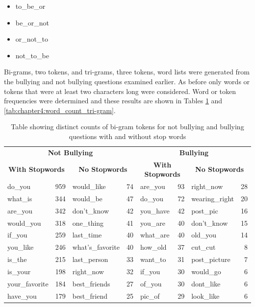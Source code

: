 \begin{itemize}

	\item to\_be\_or
	\item be\_or\_not
	\item or\_not\_to
	\item not\_to\_be
	
\end{itemize}

Bi-grams, two tokens, and tri-grams, three tokens, word lists were generated from the bullying and not bullying questions examined earlier. As before only words or tokens that were at least two characters long were considered. Word or token frequencies were determined and these results are shown in Tables \ref{tab:chapter4:word_count_bi-gram} and \ref{tab:chapter4:word_count_tri-gram}.

\begin{table}[h]
\centering
\caption[Distinct bi-gram word counts]{Table showing distinct counts of bi-gram tokens for not bullying and bullying questions with and without stop words}
\label{tab:chapter4:word_count_bi-gram}
\begin{tabular}{lrlrlrlr}
	\toprule
	\multicolumn{4}{c}{\textbf{Not Bullying}} & \multicolumn{4}{c}{\textbf{Bullying}} \\
	\cmidrule(r){1-4}
	\cmidrule(r){5-8}
	\multicolumn{2}{c}{\textbf{With Stopwords}} & \multicolumn{2}{c}{\textbf{No Stopwords}} & \multicolumn{2}{c}{\textbf{With Stopwords}} & \multicolumn{2}{c}{\textbf{No Stopwords}} \\
    \midrule
	do\_you			& 959 &	would\_like		 & 74 &	are\_you  &	93 & right\_now		& 28	\\
	what\_is		& 344 &	would\_be		 & 47 &	do\_you   &	72 & wearing\_right	& 20	\\
	are\_you		& 342 &	don't\_know		 & 42 &	you\_have &	42 & post\_pic		& 16	\\
	would\_you		& 318 &	one\_thing		 & 41 &	you\_are  &	40 & don't\_know	& 15	\\
	if\_you			& 259 &	last\_time		 & 40 &	what\_are &	40 & old\_you		& 14	\\
	you\_like		& 246 &	what's\_favorite & 40 &	how\_old  &	37 & cut\_cut		& 8	\\
	is\_the			& 215 &	last\_person	 & 33 &	want\_to  &	31 & post\_picture	& 7	\\
	is\_your		& 198 &	right\_now		 & 32 &	if\_you   &	30 & would\_go		& 6	\\
	your\_favorite	& 184 &	best\_friends	 & 27 &	of\_you   &	30 & dont\_like		& 6	\\
	have\_you		& 179 &	best\_friend	 & 25 &	pic\_of   &	29 & look\_like		& 6	\\
    \bottomrule
    \end{tabular}
\end{table}

